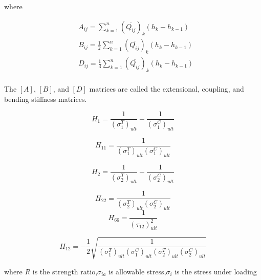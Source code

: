 \documentclass[smallextended]{svjour3}       %
\begin{document}
where

\begin{equation}
    \begin{split}
    &A_{ij}
	=
	\sum_{k=1}^n(\overline{Q_{ij}})_k(h_k-h_{k-1}) \\
    &B_{ij}
	=
	\frac{1}{2}\sum_{k=1}^n(\overline{Q_{ij}})_k(h_k-h_{k-1}) \\
    &D_{ij}
	=
	\frac{1}{3}\sum_{k=1}^n(\overline{Q_{ij}})_k(h_k-h_{k-1}) \\
    \end{split}
\end{equation}

The $[A]$, $[B]$, and $[D]$ matrices are called the extensional, coupling, and bending stiffness
matrices.

\begin{equation}
	H_{1}=\frac{1}{\left(\sigma_{1}^{T}\right)_{u l t}}-\frac{1}{\left(\sigma_{1}^{C}\right)_{u l
	t}}
\end{equation}

\begin{equation}
	H_{11}=\frac{1}{\left(\sigma_{1}^{T}\right)_{u l t}\left(\sigma_{1}^{C}\right)_{u l t}}
\end{equation}

\begin{equation}
	H_{2}=\frac{1}{\left(\sigma_{2}^{T}\right)_{u l t}}-\frac{1}{\left(\sigma_{2}^{C}\right)_{u l
	t}}
\end{equation}

\begin{equation}
	H_{22}=\frac{1}{\left(\sigma_{2}^{T}\right)_{u l t}\left(\sigma_{2}^{C}\right)_{u l t}}
\end{equation}
\begin{equation}
	H_{66}=\frac{1}{\left(\tau_{12}\right)_{u l t}^{2}}
\end{equation}

\begin{equation}
	H_{12}=-\frac{1}{2} \sqrt{\frac{1}{\left(\sigma_{1}^{T}\right)_{u l
				t}\left(\sigma_{1}^{C}\right)_{u l t}\left(\sigma_{2}^{T}\right)_{u l
	t}\left(\sigma_{2}^{C}\right)_{u l t}}}
\end{equation}





where $R$ is the strength ratio,$\sigma_{i{a}}$ is allowable stress,$\sigma_i$ is the stress under loading
\end{document}
